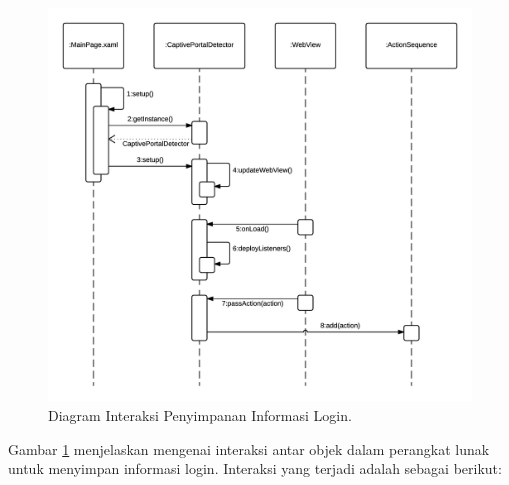 \begin{figure}[!htb]
    \centering
    \includegraphics[scale=0.9]{Gambar/SequenceDiagramLoginInformationSaving.png}
    \caption[Diagram Interaksi Penyimpanan Informasi Login.]{Diagram Interaksi Penyimpanan Informasi Login.} 
    \label{fig:LoginInformationSavingSequenceDiagram}
\end{figure}

Gambar \ref{fig:LoginInformationSavingSequenceDiagram} menjelaskan mengenai interaksi antar objek dalam perangkat lunak untuk menyimpan informasi login. Interaksi yang terjadi adalah sebagai berikut:

